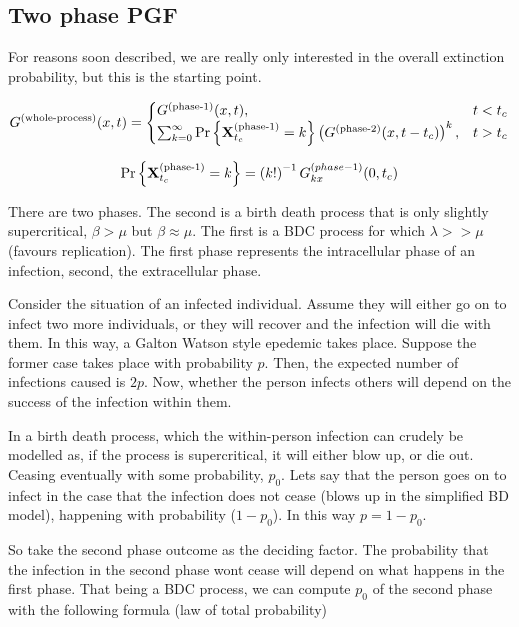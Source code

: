 \subsection{Two phase PGF}

For reasons soon described, we are really only interested in the overall extinction probability, but this is the starting point. 


$$G^{(\text{whole-process})}(x,t)    = \begin{cases}
G^{(\text{phase-1})}(x,t), & t< t_c\\
\sum_{k=0}^\infty   {\text{Pr}\left\{{\bf X}_{t_c}^{(\text{phase-1})} = k\right\}} \left( G^{(\text{phase-2})}(x,t-t_c)\right)^k, & t>t_c
\end{cases} 
$$


$$ {\text{Pr}\left\{{\bf X}_{t_c}^{(\text{phase-1})} = k\right\}}   =  \left( k!\right)^{-1}  G^{(phase-1)}_{kx}(0, t_c)$$




There are two phases. The second is a birth death process that is only slightly supercritical, $\beta > \mu$ but $\beta \approx \mu$. The first is a BDC process for which $\lambda >> \mu$ (favours replication). The first phase represents the intracellular phase of an infection, second, the extracellular phase.\par

Consider the situation of an infected individual. Assume they will either go on to infect two more individuals, or they will recover and the infection will die with them. In this way, a Galton Watson style epedemic takes place. Suppose the former case takes place with probability $p$. Then, the expected number of infections caused is $2p$. Now, whether the person infects others will depend on the success of the infection within them.\par

In a birth death process, which the within-person infection can crudely be modelled as, if the process is supercritical, it will either blow up, or die out. Ceasing eventually with some probability, $p_0$. Lets say that the person goes on to infect in the case that the infection does not cease (blows up in the simplified BD model), happening with probability ($1-p_0$). In this way $p = 1-p_0$.\par

So take the second phase outcome as the deciding factor. The probability that the infection in the second phase wont cease will depend on what happens in the first phase. That being a BDC process, we can compute $p_0$ of the second phase with the following formula (law of total probability)


